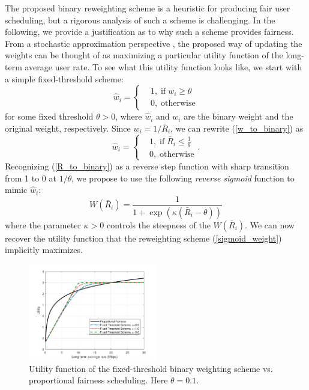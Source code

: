 \documentclass[journal,12pt,onecolumn,draftclsnofoot,]{IEEEtran}
\begin{document}
The proposed binary reweighting scheme is a heuristic for producing fair user scheduling, but a rigorous analysis of such a scheme is challenging. In the following, we provide a justification as to why such a scheme provides fairness. From a stochastic
approximation perspective \cite{kushner}, the proposed way of updating the weights can be thought of as maximizing a particular utility function of the long-term
average user rate. To see what this utility function looks like, we start with
a simple fixed-threshold scheme:
\begin{equation}
\label{w_to_binary}
	\hat w_i = \left\{
\begin{aligned}
&1,\;\text{if}\;w_i\ge\theta\\
&0,\;\text{otherwise}
\end{aligned} \right.
\end{equation}
for some fixed threshold $\theta>0$, where $\hat w_i$ and $w_i$ are the binary
weight and the original weight, respectively. Since $w_i=1/\bar R_i$, we can
rewrite (\ref{w_to_binary}) as
\begin{equation}
\label{R_to_binary}
	\hat w_i = \left\{
\begin{aligned}
&1,\;\text{if}\;\bar R_i\le\frac{1}{\theta}\\
&0,\;\text{otherwise}
\end{aligned} \right..
\end{equation}
Recognizing (\ref{R_to_binary}) as a reverse step function with sharp transition
from 1 to 0 at $1/\theta$, we propose to use the following \emph{reverse sigmoid}
function to mimic $\hat w_i$:
\begin{equation}
\label{sigmoid_weight}
W(\bar R_i) = \frac{1}{1+\exp(\kappa(\bar R_i-\theta))}
\end{equation}
where the parameter $\kappa>0$ controls the steepness of the $W(\bar R_i)$. We can now recover the utility function that the reweighting scheme (\ref{sigmoid_weight})
implicitly maximizes.

\begin{figure}
        \centering
        \includegraphics[width=0.5\textwidth]{fig/new_utility}
        \caption{Utility function of the fixed-threshold binary weighting scheme 
	    vs. proportional fairness scheduling. Here $\theta=0.1$. } 
        \label{fig:new_utility}
\end{figure}
\end{document}
